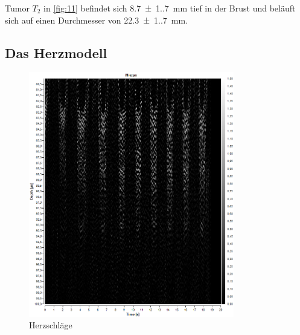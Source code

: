 \noindent Tumor $T_2$ in \autoref{fig:11} befindet sich \qty{8.7(1.7)}{\mm}
tief in der Brust und beläuft sich auf einen Durchmesser von \qty{22.3(1.7)}{\mm}.

\subsection{Das Herzmodell}

\begin{figure}[H]
  \centering
  \caption{Herzschläge}
  \label{fig:14}
  \includegraphics[width=0.8\textwidth]{Bilder/Herz2.png}
\end{figure}

